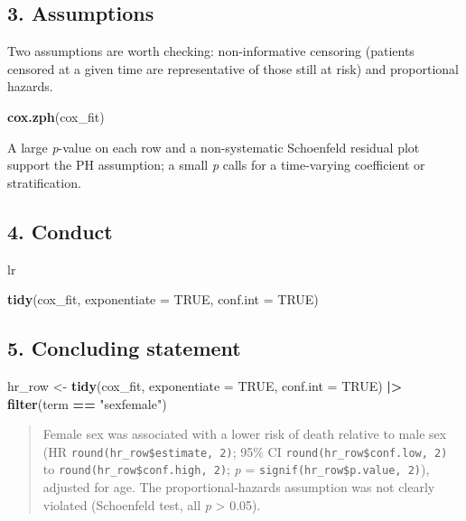\documentclass[
]{article}
\newenvironment{Shaded}{\begin{snugshade}}{\end{snugshade}}
\newcommand{\AttributeTok}[1]{\textcolor[rgb]{0.13,0.29,0.53}{#1}}
\newcommand{\ConstantTok}[1]{\textcolor[rgb]{0.56,0.35,0.01}{#1}}
\newcommand{\FunctionTok}[1]{\textcolor[rgb]{0.13,0.29,0.53}{\textbf{#1}}}
\newcommand{\NormalTok}[1]{#1}
\newcommand{\OtherTok}[1]{\textcolor[rgb]{0.56,0.35,0.01}{#1}}
\newcommand{\SpecialCharTok}[1]{\textcolor[rgb]{0.81,0.36,0.00}{\textbf{#1}}}
\newcommand{\StringTok}[1]{\textcolor[rgb]{0.31,0.60,0.02}{#1}}
\begin{document}
\subsection{3. Assumptions}\label{assumptions}

Two assumptions are worth checking: non-informative censoring (patients
censored at a given time are representative of those still at risk) and
proportional hazards.

\begin{Shaded}
\begin{Highlighting}[]
\FunctionTok{cox.zph}\NormalTok{(cox\_fit)}
\end{Highlighting}
\end{Shaded}

A large \emph{p}-value on each row and a non-systematic Schoenfeld
residual plot support the PH assumption; a small \emph{p} calls for a
time-varying coefficient or stratification.

\subsection{4. Conduct}\label{conduct}

\begin{Shaded}
\begin{Highlighting}[]
\NormalTok{lr}

\FunctionTok{tidy}\NormalTok{(cox\_fit, }\AttributeTok{exponentiate =} \ConstantTok{TRUE}\NormalTok{, }\AttributeTok{conf.int =} \ConstantTok{TRUE}\NormalTok{)}
\end{Highlighting}
\end{Shaded}

\subsection{5. Concluding statement}\label{concluding-statement}

\begin{Shaded}
\begin{Highlighting}[]
\NormalTok{hr\_row }\OtherTok{\textless{}{-}} \FunctionTok{tidy}\NormalTok{(cox\_fit, }\AttributeTok{exponentiate =} \ConstantTok{TRUE}\NormalTok{, }\AttributeTok{conf.int =} \ConstantTok{TRUE}\NormalTok{) }\SpecialCharTok{|\textgreater{}}
  \FunctionTok{filter}\NormalTok{(term }\SpecialCharTok{==} \StringTok{"sexfemale"}\NormalTok{)}
\end{Highlighting}
\end{Shaded}

\begin{quote}
Female sex was associated with a lower risk of death relative to male
sex (HR \texttt{round(hr\_row\$estimate,\ 2)}; 95\% CI
\texttt{round(hr\_row\$conf.low,\ 2)} to
\texttt{round(hr\_row\$conf.high,\ 2)}; \emph{p} =
\texttt{signif(hr\_row\$p.value,\ 2)}), adjusted for age. The
proportional-hazards assumption was not clearly violated (Schoenfeld
test, all \emph{p} \textgreater{} 0.05).
\end{quote}
\end{document}
